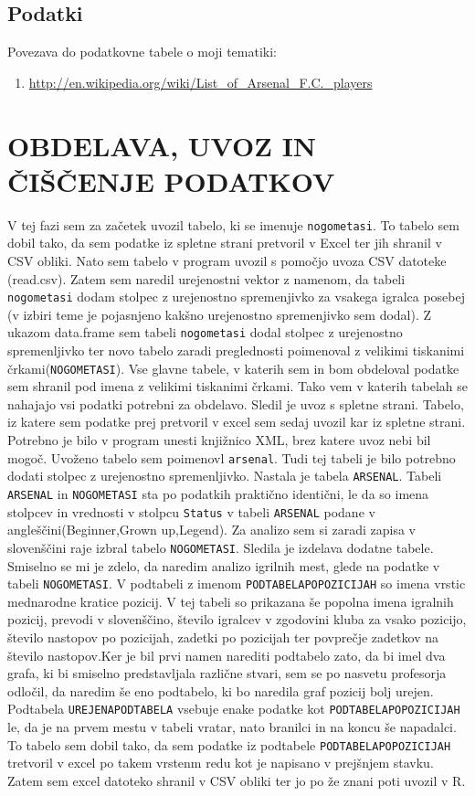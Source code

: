 \documentclass[11pt,a4paper]{article}
\begin{document}
\subsection{Podatki}
Povezava do podatkovne tabele o moji tematiki: 
\begin{enumerate}
\item{\url{http://en.wikipedia.org/wiki/List_of_Arsenal_F.C._players}}
\end{enumerate}

\section{OBDELAVA, UVOZ IN ČIŠČENJE PODATKOV}
V tej fazi sem za začetek uvozil tabelo, ki se imenuje \verb|nogometasi|. To tabelo sem dobil tako, da sem podatke iz spletne strani pretvoril v Excel ter jih shranil v CSV obliki. Nato sem tabelo v program uvozil s pomočjo uvoza CSV datoteke (read.csv). Zatem sem naredil urejenostni vektor z namenom, da tabeli \verb|nogometasi| dodam stolpec z urejenostno spremenjivko za vsakega igralca posebej (v izbiri teme je pojasnjeno kakšno urejenostno spremenjivko sem dodal). Z ukazom data.frame sem tabeli \verb|nogometasi| dodal stolpec z urejenostno spremenljivko ter novo tabelo zaradi preglednosti poimenoval z velikimi tiskanimi črkami(\verb|NOGOMETASI|). Vse glavne tabele, v katerih sem in bom obdeloval podatke sem shranil pod imena z velikimi tiskanimi črkami. Tako vem v katerih tabelah se nahajajo vsi podatki potrebni za obdelavo.
Sledil je uvoz s spletne strani. Tabelo, iz katere sem podatke prej pretvoril v excel sem sedaj uvozil kar iz spletne strani. Potrebno je bilo v program unesti knjižnico XML, brez katere uvoz nebi bil mogoč. Uvoženo tabelo sem poimenovl \verb|arsenal|. Tudi tej tabeli je bilo potrebno dodati stolpec z urejenostno spremenljivko. Nastala je tabela \verb|ARSENAL|. Tabeli \verb|ARSENAL| in \verb|NOGOMETASI| sta po podatkih praktično identični, le da so imena stolpcev in vrednosti v stolpcu  \verb|Status| v tabeli \verb|ARSENAL| podane v angleščini(Beginner,Grown up,Legend). Za analizo sem si zaradi zapisa v slovenščini raje izbral tabelo \verb|NOGOMETASI|.
Sledila je izdelava dodatne tabele. Smiselno se mi je zdelo, da naredim analizo igrilnih mest, glede na podatke v tabeli \verb|NOGOMETASI|. V podtabeli z imenom \verb|PODTABELAPOPOZICIJAH| so imena vrstic mednarodne kratice pozicij. V tej tabeli so prikazana še popolna imena igralnih pozicij, prevodi v slovenščino, število igralcev v zgodovini kluba za vsako pozicijo, število nastopov po pozicijah, zadetki po pozicijah ter povprečje zadetkov na število nastopov.Ker je bil prvi namen narediti podtabelo zato, da bi imel dva grafa, ki bi smiselno predstavljala različne stvari, sem se po nasvetu profesorja odločil, da naredim še eno podtabelo, ki bo naredila graf pozicij bolj urejen. Podtabela \verb|UREJENAPODTABELA| vsebuje enake podatke kot \verb|PODTABELAPOPOZICIJAH| le, da je na prvem mestu v tabeli vratar, nato branilci in na koncu še napadalci. To tabelo sem dobil tako, da sem podatke iz podtabele \verb|PODTABELAPOPOZICIJAH| tretvoril v excel po takem vrstenm redu kot je napisano v prejšnjem stavku. Zatem sem excel datoteko shranil v CSV obliki ter jo po že znani poti uvozil v R.
\end{document}
